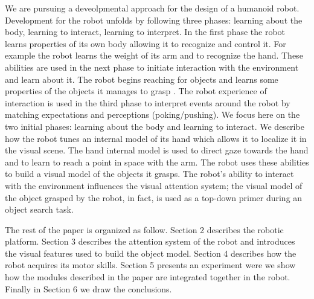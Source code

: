 We are pursuing a deveolpmental approach for the design of a humanoid robot. Development for the robot unfolds by following three phases: learning about the body, learning to interact, learning to interpret. In the first phase the robot learns properties of its own body allowing it to recognize and control it. For example the robot learns the weight of its arm and to recognize the hand. These abilities are used in the next phase to initiate interaction with the environment and learn about it. The robot begins reaching for objects and learns some properties of the objects it manages to grasp \cite{natale04learning,natale05exploring,torres-jara05tapping}. The robot experience of interaction is used in the third phase to interpret events around the robot by matching expectations and perceptions (poking/pushing). We focus here on the two initial phases: learning about the body and learning to interact. We describe how the robot tunes an internal model of its hand which allows it to localize it in the visual scene. The hand internal model is used to direct gaze towards the hand and to learn to reach a point in space with the arm. The robot uses these abilities to build a visual model of the objects it grasps. The robot's ability to interact with the environment influences the visual attention system; the visual model of the object grasped by the robot, in fact, is used as a top-down primer during an object search task.

The rest of the paper is organized as follow. Section 2 describes the robotic platform. Section 3 describes the attention system of the robot and introduces the visual features used to build the object model. Section 4 describes how the robot acquires its motor skills. Section 5 presents an experiment were we show how the modules described in the paper are integrated together in the robot. Finally in Section 6 we draw the conclusions.
